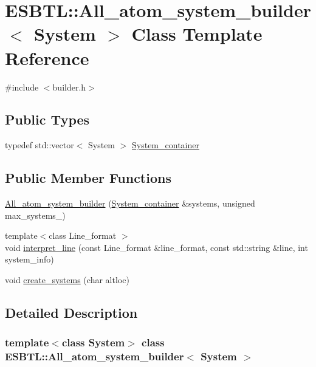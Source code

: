 \hypertarget{classESBTL_1_1All__atom__system__builder}{}\section{E\+S\+B\+TL\+:\+:All\+\_\+atom\+\_\+system\+\_\+builder$<$ System $>$ Class Template Reference}
\label{classESBTL_1_1All__atom__system__builder}


{\ttfamily \#include $<$builder.\+h$>$}

\subsection*{Public Types}
\begin{DoxyCompactItemize}
\item 
typedef std\+::vector$<$ System $>$ \hyperlink{classESBTL_1_1All__atom__system__builder_a31fb2f5199f57623e8c3582405d3c0bb}{System\+\_\+container}
\end{DoxyCompactItemize}
\subsection*{Public Member Functions}
\begin{DoxyCompactItemize}
\item 
\hyperlink{classESBTL_1_1All__atom__system__builder_a21d079ea5c05ee7063255846fce8ad8b}{All\+\_\+atom\+\_\+system\+\_\+builder} (\hyperlink{classESBTL_1_1All__atom__system__builder_a31fb2f5199f57623e8c3582405d3c0bb}{System\+\_\+container} \&systems, unsigned max\+\_\+systems\+\_\+)
\item 
{\footnotesize template$<$class Line\+\_\+format $>$ }\\void \hyperlink{classESBTL_1_1All__atom__system__builder_adfd441d4f75b5d1ade101977b32276d1}{interpret\+\_\+line} (const Line\+\_\+format \&line\+\_\+format, const std\+::string \&line, int system\+\_\+info)
\item 
void \hyperlink{classESBTL_1_1All__atom__system__builder_afc0da7bcb41d85c5092e97507a7acddc}{create\+\_\+systems} (char altloc)
\end{DoxyCompactItemize}


\subsection{Detailed Description}
\subsubsection*{template$<$class System$>$\newline
class E\+S\+B\+T\+L\+::\+All\+\_\+atom\+\_\+system\+\_\+builder$<$ System $>$}

